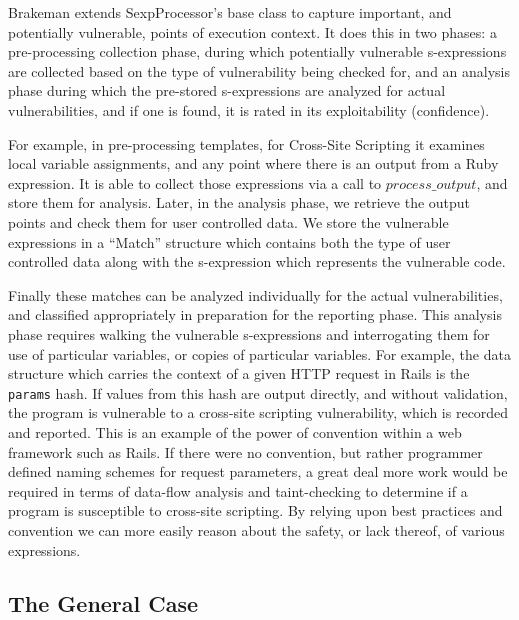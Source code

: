 \documentclass[conference]{IEEEtran}
\begin{document}
Brakeman extends SexpProcessor's base class to capture important, and
potentially vulnerable, points of execution context.  It does this in two
phases: a pre-processing collection phase, during which potentially vulnerable
s-expressions are collected based on the type of vulnerability being checked
for, and an analysis phase during which the pre-stored s-expressions are
analyzed for actual vulnerabilities, and if one is found, it is rated in its
exploitability (confidence).

For example, in pre-processing templates, for Cross-Site Scripting it examines
local variable assignments, and any point where there is an output from a Ruby
expression.  It is able to collect those expressions via a call to
$process\_output$, and store them for analysis.  Later, in the analysis
phase, we retrieve the output points and check them for user controlled data.
We store the vulnerable expressions in a ``Match'' structure which contains both
the type of user controlled data along with the s-expression which represents
the vulnerable code.

Finally these matches can be analyzed individually for the actual
vulnerabilities, and classified appropriately in preparation for the reporting
phase.  This analysis phase requires walking the vulnerable s-expressions and
interrogating them for use of particular variables, or copies of particular
variables.  For example, the data structure which carries the context of a given
HTTP request in Rails is the \texttt{params} hash.   If values from this hash
are output directly, and without validation, the program is vulnerable to a
cross-site scripting vulnerability, which is recorded and reported.  This is an
example of the power of convention within a web framework such as Rails.  If
there were no convention, but rather programmer defined naming schemes for
request parameters, a great deal more work would be required in terms of
data-flow analysis and taint-checking to determine if a program is susceptible
to cross-site scripting.  By relying upon best practices and convention we can
more easily reason about the safety, or lack thereof, of various expressions.

\subsection{The General Case}
\end{document}
